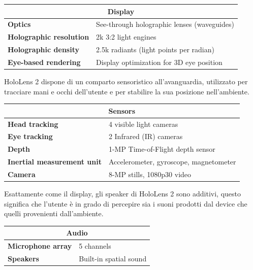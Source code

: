 \begin{center}
    \begin{tabular}{ p{6cm} p{7cm} }
        \hline
        \multicolumn{2}{c}{\textbf{Display}} \\
        \hline
        \textbf{Optics} & See-through holographic lenses (waveguides)\\
        \hline
        \textbf{Holographic resolution} & 2k 3:2 light engines\\
        \hline
        \textbf{Holographic density} & 2.5k radiants (light points per radian)\\
        \hline
        \textbf{Eye-based rendering} & Display optimization for 3D eye position\\
        \hline
    \end{tabular}
\end{center}

    HoloLens 2 dispone di un comparto sensoristico all'avanguardia, utilizzato per tracciare mani e occhi dell'utente e per stabilire la sua posizione nell'ambiente.

\begin{center}
    \begin{tabular}{ p{6cm} p{7cm} }
        \hline
        \multicolumn{2}{c}{\textbf{Sensors}} \\
        \hline
        \textbf{Head tracking} & 4 visible light cameras\\
        \hline
        \textbf{Eye tracking} & 2 Infrared (IR) cameras\\
        \hline
        \textbf{Depth} & 1-MP Time-of-Flight depth sensor\\
        \hline
        \textbf{Inertial measurement unit} & Accelerometer, gyroscope, magnetometer\\
        \hline
        \textbf{Camera} & 8-MP stills, 1080p30 video\\
        \hline
    \end{tabular}
\end{center}

Esattamente come il display, gli speaker di HoloLens 2 sono additivi, questo significa che l'utente è in grado di percepire sia i suoni prodotti dal device che quelli provenienti dall'ambiente.
    
\begin{center}
    \begin{tabular}{ p{6cm} p{7cm} }
        \hline
        \multicolumn{2}{c}{\textbf{Audio}} \\
        \hline
        \textbf{Microphone array} & 5 channels\\
        \hline
        \textbf{Speakers} & Built-in spatial sound\\
        \hline
    \end{tabular}
\end{center}

